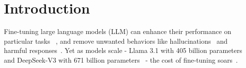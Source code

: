 
\section{Introduction}

Fine-tuning large language models (LLM) can enhance their performance on particular tasks ~\cite{wei2021finetuned,wang2022super, ziegler2019fine}, and remove unwanted behaviors like hallucinations~\cite{hu2024mitigating,liu2023mitigating} and harmful responses~\cite{bai2022training,askell2021general}.  Yet as models scale -  \eg Llama 3.1 with 405 billion parameters~\cite{dubey2024llama} and DeepSeek-V3 with 671 billion parameters~\cite{liu2024deepseek} - the cost of fine-tuning soars~\cite{hu2021lora}. 




